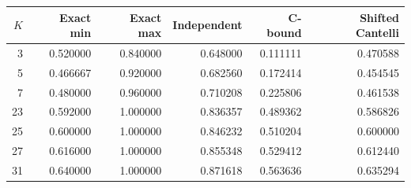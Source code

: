 \begin{tabular}{@{}rrrrrr@{}}
\toprule
$K$ & Exact min & Exact max & Independent & C-bound & Shifted Cantelli\\\midrule
3 & 0.520000 & 0.840000 & 0.648000 & 0.111111 & 0.470588 \\
5 & 0.466667 & 0.920000 & 0.682560 & 0.172414 & 0.454545 \\
7 & 0.480000 & 0.960000 & 0.710208 & 0.225806 & 0.461538 \\
23 & 0.592000 & 1.000000 & 0.836357 & 0.489362 & 0.586826 \\
25 & 0.600000 & 1.000000 & 0.846232 & 0.510204 & 0.600000 \\
27 & 0.616000 & 1.000000 & 0.855348 & 0.529412 & 0.612440 \\
31 & 0.640000 & 1.000000 & 0.871618 & 0.563636 & 0.635294 \\
\bottomrule
\end{tabular}
